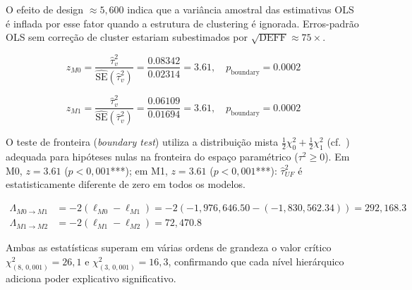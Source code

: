 \noindent
O efeito de design $\approx 5,600$ indica que a variância amostral das estimativas OLS
é inflada por esse fator quando a estrutura de clustering é ignorada. Erros-padrão OLS sem
correção de cluster estariam subestimados por $\sqrt{\text{DEFF}} \approx 75\times$.

\begin{equation}
  z_{M0} = \frac{\hat{\tau}^2_v}{\widehat{\text{SE}}(\hat{\tau}^2_v)}
  = \frac{0.08342}{0.02314}
  = 3.61, \quad p_\text{boundary} = 0.0002
  \label{eq:wald_m0}
\end{equation}

\begin{equation}
  z_{M1} = \frac{\hat{\tau}^2_v}{\widehat{\text{SE}}(\hat{\tau}^2_v)}
  = \frac{0.06109}{0.01694}
  = 3.61, \quad p_\text{boundary} = 0.0002
  \label{eq:wald_m1}
\end{equation}

\noindent
O teste de fronteira (\textit{boundary test}) utiliza a distribuição mista
$\frac{1}{2}\chi^2_0 + \frac{1}{2}\chi^2_1$ (cf.\ \citealt{raudenbush2002}) adequada para
hipóteses nulas na fronteira do espaço paramétrico ($\tau^2 \geq 0$).
Em M0, $z = 3.61$ ($p < 0{,}001$***); em M1, $z = 3.61$
($p < 0{,}001$***): $\hat{\tau}^2_{UF}$ é estatisticamente diferente de zero
em todos os modelos.

\begin{align}
  \Lambda_{M0 \to M1} &= -2\left(\ell_{M0} - \ell_{M1}\right)
    = -2\left(-1,976,646.50 - (-1,830,562.34)\right)
    = 292,168.3 \label{eq:lrt01} \\
  \Lambda_{M1 \to M2} &= -2\left(\ell_{M1} - \ell_{M2}\right)
    = 72,470.8 \label{eq:lrt12}
\end{align}

\noindent
Ambas as estatísticas superam em várias ordens de grandeza o valor crítico
$\chi^2_{(8,\,0{,}001)} = 26{,}1$ e $\chi^2_{(3,\,0{,}001)} = 16{,}3$,
confirmando que cada nível hierárquico adiciona poder explicativo significativo.


